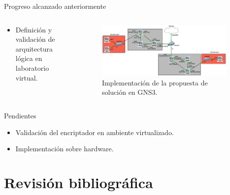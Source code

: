\documentclass[serif, aspectratio=169]{beamer}
\begin{document}
\begin{frame}{Progreso alcanzado anteriormente}
    \begin{columns}
    \begin{column}{0.33\textwidth}

    \begin{itemize}
        \item Definición y validación de arquitectura lógica en laboratorio virtual.
    \end{itemize}

    \end{column}
    \begin{column}{0.7\textwidth}
    \begin{figure}
        \centering
        \includegraphics[width=0.95\textwidth]{images/gns3_2.png}
        \caption{Implementación de la propuesta de solución en GNS3.} 
    \end{figure}
    \end{column}
\end{columns}
\end{frame}

\begin{frame}{Pendientes}
    \begin{itemize}
        \item Validación del encriptador en ambiente virtualizado. 
        \item Implementación sobre hardware.
    \end{itemize}

\end{frame}

\section{Revisión bibliográfica}
\end{document}
